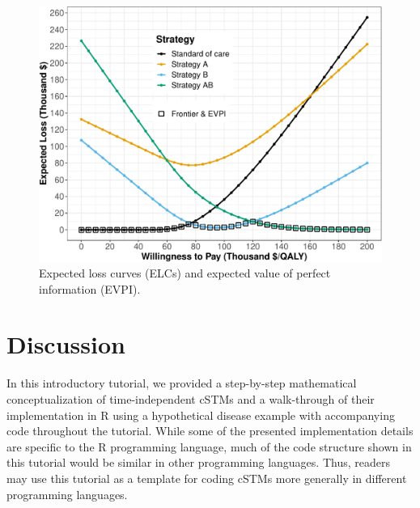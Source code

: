 \documentclass[
]{article}
\begin{document}
\begin{figure}[H]

{\centering \includegraphics{figs/ELC-1} 

}

\caption{Expected loss curves (ELCs) and expected value of perfect information (EVPI).}\label{fig:ELC}
\end{figure}

\hypertarget{discussion}{%
\section{Discussion}\label{discussion}}

In this introductory tutorial, we provided a step-by-step mathematical conceptualization of time-independent cSTMs and a walk-through of their implementation in R using a hypothetical disease example with accompanying code throughout the tutorial. While some of the presented implementation details are specific to the R programming language, much of the code structure shown in this tutorial would be similar in other programming languages. Thus, readers may use this tutorial as a template for coding cSTMs more generally in different programming languages.
\end{document}

